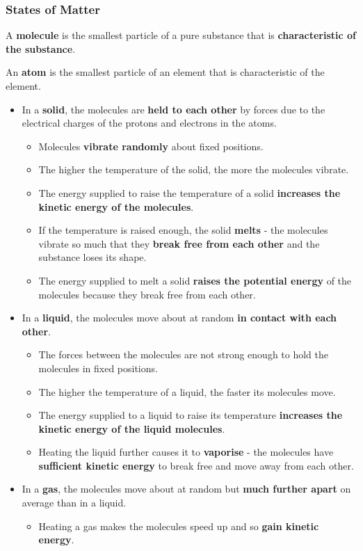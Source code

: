 \subsubsection*{States of Matter}

A \textbf{molecule} is the smallest particle of a pure substance that is \textbf{characteristic of the substance}.

An \textbf{atom} is the smallest particle of an element that is characteristic of the element.

\begin{itemize}
    \item In a \textbf{solid}, the molecules are \textbf{held to each other} by forces due to the electrical charges of the protons and electrons in the atoms.
        \begin{itemize}
            \item Molecules \textbf{vibrate randomly} about fixed positions.
            \item The higher the temperature of the solid, the more the molecules vibrate.
            \item The energy supplied to raise the temperature of a solid \textbf{increases the kinetic energy of the molecules}.
            \item If the temperature is raised enough, the solid \textbf{melts} - the molecules vibrate so much that they \textbf{break free from each other} and the substance loses its shape.
            \item The energy supplied to melt a solid \textbf{raises the potential energy} of the molecules because they break free from each other.
        \end{itemize}
    \item In a \textbf{liquid}, the molecules move about at random \textbf{in contact with each other}.
        \begin{itemize}
            \item The forces between the molecules are not strong enough to hold the molecules in fixed positions.
            \item The higher the temperature of a liquid, the faster its molecules move.
            \item The energy supplied to a liquid to raise its temperature \textbf{increases the kinetic energy of the liquid molecules}.
            \item Heating the liquid further causes it to \textbf{vaporise} - the molecules have \textbf{sufficient kinetic energy} to break free and move away from each other.
        \end{itemize}
    \item In a \textbf{gas}, the molecules move about at random but \textbf{much further apart} on average than in a liquid.
        \begin{itemize}
            \item Heating a gas makes the molecules speed up and so \textbf{gain kinetic energy}.
        \end{itemize}
\end{itemize}

